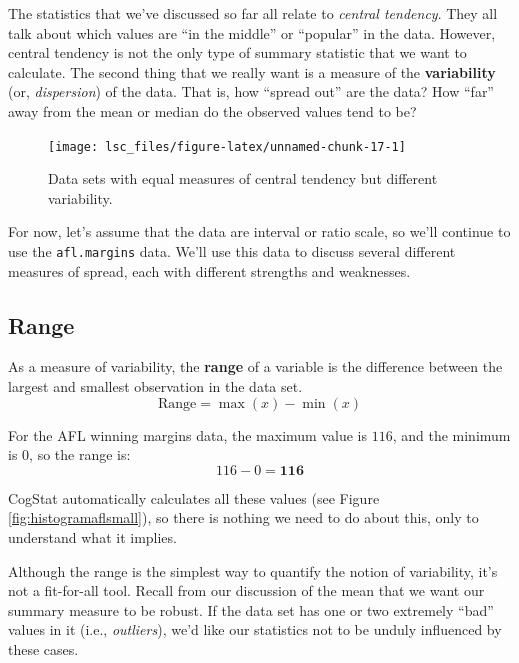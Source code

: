 \documentclass[
  11pt,
  a4paper,
  twoside,symmetric,openright]{book}
\theoremstyle{break}
\theoremstyle{break}
\begin{document}
The statistics that we've discussed so far all relate to \emph{central tendency}. They all talk about which values are ``in the middle'' or ``popular'' in the data. However, central tendency is not the only type of summary statistic that we want to calculate. The second thing that we really want is a measure of the \textbf{variability} (or, \emph{dispersion}) of the data. That is, how ``spread out'' are the data? How ``far'' away from the mean or median do the observed values tend to be?

\begin{figure}

{\centering \texttt{[image: lsc\_files/figure-latex/unnamed-chunk-17-1]} 

}

\caption{Data sets with equal measures of central tendency but different variability.}\label{fig:unnamed-chunk-17}
\end{figure}

For now, let's assume that the data are interval or ratio scale, so we'll continue to use the \texttt{afl.margins} data. We'll use this data to discuss several different measures of spread, each with different strengths and weaknesses.

\hypertarget{range}{%
\subsection{Range}\label{range}}

\begin{definition}[Range]
\protect\hypertarget{def:defrange}{}\label{def:defrange}As a measure of variability, the \textbf{range} of a variable is the difference between the largest and smallest observation in the data set.
\[
\text{Range}=\max(x)-\min(x)
\]
\end{definition}

\begin{example}[Range]
\protect\hypertarget{exm:exrange}{}\label{exm:exrange}For the AFL winning margins data, the maximum value is \(116\), and the minimum is \(0\), so the range is:
\[116-0=\mathbf{116}\]
\end{example}

CogStat automatically calculates all these values (see Figure \ref{fig:histogramaflsmall}), so there is nothing we need to do about this, only to understand what it implies.

Although the range is the simplest way to quantify the notion of variability, it's not a fit-for-all tool. Recall from our discussion of the mean that we want our summary measure to be robust. If the data set has one or two extremely ``bad'' values in it (i.e., \emph{outliers}), we'd like our statistics not to be unduly influenced by these cases.
\end{document}
